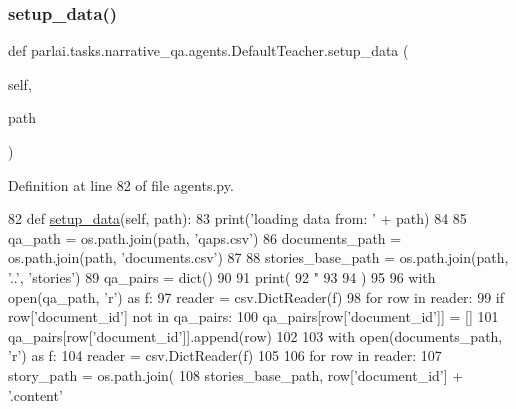 \subsubsection{\texorpdfstring{setup\+\_\+data()}{setup\_data()}}
{\footnotesize\ttfamily def parlai.\+tasks.\+narrative\+\_\+qa.\+agents.\+Default\+Teacher.\+setup\+\_\+data (\begin{DoxyParamCaption}\item[{}]{self,  }\item[{}]{path }\end{DoxyParamCaption})}



Definition at line 82 of file agents.\+py.


\begin{DoxyCode}
82     \textcolor{keyword}{def }\hyperlink{namespaceparlai_1_1tasks_1_1multinli_1_1agents_a4fa2cb0ba1ed745336ad8bceed36b841}{setup\_data}(self, path):
83         print(\textcolor{stringliteral}{'loading data from: '} + path)
84 
85         qa\_path = os.path.join(path, \textcolor{stringliteral}{'qaps.csv'})
86         documents\_path = os.path.join(path, \textcolor{stringliteral}{'documents.csv'})
87 
88         stories\_base\_path = os.path.join(path, \textcolor{stringliteral}{'..'}, \textcolor{stringliteral}{'stories'})
89         qa\_pairs = dict()
90 
91         print(
92             \textcolor{stringliteral}{"%
93             %
94         )
95 
96         with open(qa\_path, \textcolor{stringliteral}{'r') as f:}
97 \textcolor{stringliteral}{            reader = csv.DictReader(f)}
98 \textcolor{stringliteral}{            }\textcolor{keywordflow}{for} row \textcolor{keywordflow}{in} reader:
99                 \textcolor{keywordflow}{if} row[\textcolor{stringliteral}{'document\_id'}] \textcolor{keywordflow}{not} \textcolor{keywordflow}{in} qa\_pairs:
100                     qa\_pairs[row[\textcolor{stringliteral}{'document\_id'}]] = []
101                 qa\_pairs[row[\textcolor{stringliteral}{'document\_id'}]].append(row)
102 
103         with open(documents\_path, \textcolor{stringliteral}{'r') as f:}
104 \textcolor{stringliteral}{            reader = csv.DictReader(f)}
105 \textcolor{stringliteral}{}
106 \textcolor{stringliteral}{            }\textcolor{keywordflow}{for} row \textcolor{keywordflow}{in} reader:
107                 story\_path = os.path.join(
108                     stories\_base\_path, row[\textcolor{stringliteral}{'document\_id'}] + \textcolor{stringliteral}{'.content'}
}
\end{DoxyCode}
